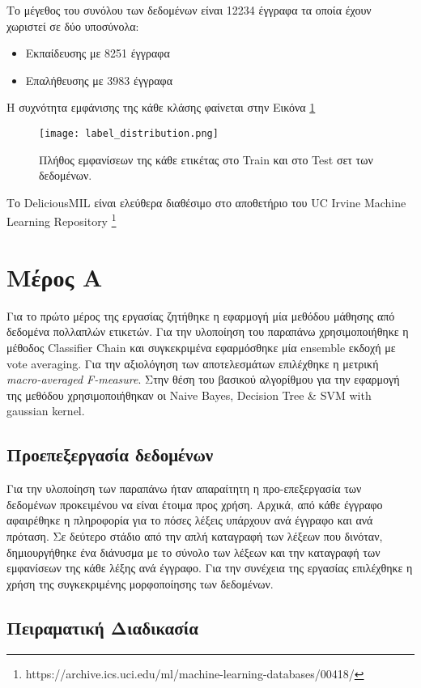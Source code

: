 Το μέγεθος του συνόλου των δεδομένων είναι 12234 έγγραφα τα οποία έχουν χωριστεί σε δύο υποσύνολα: 
	\begin{itemize}
		\item Εκπαίδευσης με 8251 έγγραφα
		\item Επαλήθευσης με 3983 έγγραφα
	\end{itemize}


Η συχνότητα εμφάνισης της κάθε κλάσης φαίνεται στην Εικόνα \ref{fig: label_distribution}

\begin{figure}
	\texttt{[image: label\_distribution.png]}
	\caption{Πλήθος εμφανίσεων της κάθε ετικέτας στο Train και στο Test σετ των δεδομένων.}
	\label{fig: label_distribution}
\end{figure}


Το DeliciousMIL είναι ελεύθερα διαθέσιμο στο αποθετήριο του UC Irvine Machine Learning Repository \footnote{https://archive.ics.uci.edu/ml/machine-learning-databases/00418/}


\section{Μέρος Α}
Για το πρώτο μέρος της εργασίας ζητήθηκε η εφαρμογή μία μεθόδου μάθησης από δεδομένα πολλαπλών ετικετών. Για την υλοποίηση του παραπάνω χρησιμοποιήθηκε η μέθοδος Classifier Chain και συγκεκριμένα εφαρμόσθηκε μία ensemble εκδοχή με vote averaging. Για την αξιολόγηση των αποτελεσμάτων επιλέχθηκε η μετρική \emph{macro-averaged F-measure}. Στην θέση του βασικού αλγορίθμου για την εφαρμογή της μεθόδου χρησιμοποιήθηκαν οι Naive Bayes, Decision Tree \& SVM with gaussian kernel. 

\subsection{Προεπεξεργασία δεδομένων}
Για την υλοποίηση των παραπάνω ήταν απαραίτητη η προ-επεξεργασία των δεδομένων προκειμένου να είναι έτοιμα προς χρήση. Αρχικά, από κάθε έγγραφο αφαιρέθηκε η πληροφορία για το πόσες λέξεις υπάρχουν ανά έγγραφο και ανά πρόταση. Σε δεύτερο στάδιο από την απλή καταγραφή των λέξεων που δινόταν, δημιουργήθηκε ένα διάνυσμα με το σύνολο των λέξεων και την καταγραφή των εμφανίσεων της κάθε λέξης ανά έγγραφο. Για την συνέχεια της εργασίας επιλέχθηκε η χρήση της συγκεκριμένης μορφοποίησης των δεδομένων.

 
\subsection{Πειραματική Διαδικασία}


